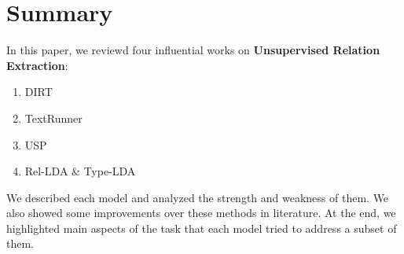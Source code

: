 \documentclass[12pt]{report}
\begin{document}
\section{Summary}
\label{ch:conclusion}

In this paper, we reviewd four influential works on \textbf{Unsupervised Relation Extraction}:
\begin{enumerate}
  \item DIRT
  \item TextRunner
  \item USP
  \item Rel-LDA \& Type-LDA
\end{enumerate}

We described each model and analyzed the strength and weakness of them. We also showed some improvements over these
 methods in literature. At the end, we highlighted main aspects of the task that each model tried to address a subset of them.
 






\pagebreak

\begin{footnotesize}

%

\end{footnotesize}
\end{document}
